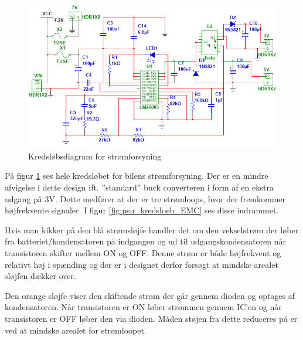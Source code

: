 \begin{landscape}
\begin{figure}[h]
\centering
\includegraphics[height=\textwidth -3.2 cm]{../fig/diagrammer/bil/psu_kredsloeb}
\caption{Kredsløbsdiagram for strømforsyning}
\label{fig:psu_kredsloeb}
\end{figure}
\end{landscape}

\clearpage

På figur \ref{fig:psu_kredsloeb} ses hele kredsløbet for bilens strømforsyning. 
Der er en mindre afvigelse i dette design ift. ''standard'' buck converteren i form af en ekstra udgang på 3V.
Dette medfører at der er tre strømloops, hvor der fremkommer højfrekvente signaler.
I figur \ref{fig:psu_kredsloeb_EMC} ses disse indrammet.

Hvis man kikker på den blå strømsløjfe handler det om den vekselstrøm der løber fra batteriet/kondensatoren på indgangen og ud til udgangskondensatoren når transistoren skifter mellem ON og OFF. 
Denne strøm er både højfrekvent og relativt høj i spænding og der er i designet derfor forsøgt at mindske arealet sløjfen dækker over.

Den orange sløjfe viser den skiftende strøm der går gennem dioden og optages af kondensatoren.
Når transistoren er ON løber strømmen gennem IC'en og når transistoren er OFF løber den via dioden.
Måden støjen fra dette reduceres på er ved at mindske arealet for strømloopet.


